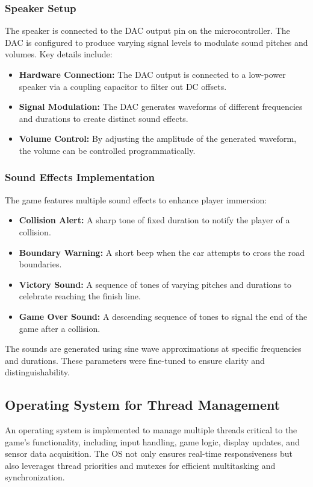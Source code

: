 \documentclass[conference]{IEEEtran}
\begin{document}
\subsubsection{Speaker Setup}
The speaker is connected to the DAC output pin on the microcontroller. The DAC is configured to produce varying signal levels to modulate sound pitches and volumes. Key details include:
\begin{itemize}
    \item \textbf{Hardware Connection:} The DAC output is connected to a low-power speaker via a coupling capacitor to filter out DC offsets.
    \item \textbf{Signal Modulation:} The DAC generates waveforms of different frequencies and durations to create distinct sound effects.
    \item \textbf{Volume Control:} By adjusting the amplitude of the generated waveform, the volume can be controlled programmatically.
\end{itemize}

\subsubsection{Sound Effects Implementation}
The game features multiple sound effects to enhance player immersion:
\begin{itemize}
    \item \textbf{Collision Alert:} A sharp tone of fixed duration to notify the player of a collision.
    \item \textbf{Boundary Warning:} A short beep when the car attempts to cross the road boundaries.
    \item \textbf{Victory Sound:} A sequence of tones of varying pitches and durations to celebrate reaching the finish line.
    \item \textbf{Game Over Sound:} A descending sequence of tones to signal the end of the game after a collision.
\end{itemize}
The sounds are generated using sine wave approximations at specific frequencies and durations. These parameters were fine-tuned to ensure clarity and distinguishability.

\subsection{Operating System for Thread Management}  
An operating system is implemented to manage multiple threads critical to the game's functionality, including input handling, game logic, display updates, and sensor data acquisition. The OS not only ensures real-time responsiveness but also leverages thread priorities and mutexes for efficient multitasking and synchronization.  
\end{document}
